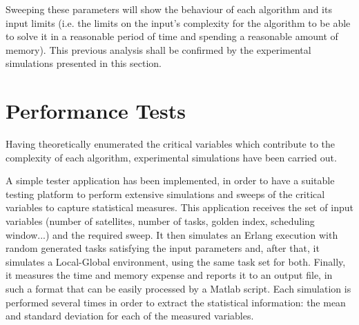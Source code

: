 Sweeping these parameters will show the behaviour of each algorithm and its input limits (i.e. the limits on the input's complexity for the algorithm to be able to solve it in a reasonable period of time and spending a reasonable amount of memory). This previous analysis shall be confirmed by the experimental simulations presented in this section.

\section{Performance Tests}

Having theoretically enumerated the critical variables which contribute to the complexity of each algorithm, experimental simulations have been carried out.

A simple tester application has been implemented, in order to have a suitable testing platform to perform extensive simulations and sweeps of the critical variables to capture statistical measures. This application receives the set of input variables (number of satellites, number of tasks, golden index, scheduling window...) and the required sweep. It then simulates an Erlang execution with random generated tasks satisfying the input parameters and, after that, it simulates a Local-Global environment, using the same task set for both. Finally, it measures the time and memory expense and reports it to an output file, in such a format that can be easily processed by a Matlab script. Each simulation is performed several times in order to extract the statistical information: the mean and standard deviation for each of the measured variables.


